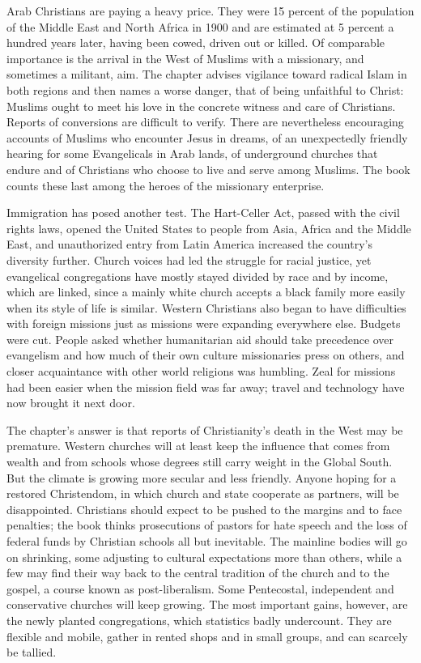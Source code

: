 Arab Christians are paying a heavy price. They were 15 percent of the population of the Middle East
and North Africa in 1900 and are estimated at 5 percent a hundred years later, having been cowed,
driven out or killed. Of comparable importance is the arrival in the West of Muslims with a
missionary, and sometimes a militant, aim. The chapter advises vigilance toward radical Islam in both
regions and then names a worse danger, that of being unfaithful to Christ: Muslims ought to meet his
love in the concrete witness and care of Christians. Reports of conversions are difficult to verify.
There are nevertheless encouraging accounts of Muslims who encounter Jesus in dreams, of an
unexpectedly friendly hearing for some Evangelicals in Arab lands, of underground churches that
endure and of Christians who choose to live and serve among Muslims. The book counts these last among
the heroes of the missionary enterprise.

Immigration has posed another test. The Hart-Celler Act, passed with the civil rights laws, opened
the United States to people from Asia, Africa and the Middle East, and unauthorized entry from Latin
America increased the country's diversity further. Church voices had led the struggle for racial
justice, yet evangelical congregations have mostly stayed divided by race and by income, which are
linked, since a mainly white church accepts a black family more easily when its style of life is
similar. Western Christians also began to have difficulties with foreign missions just as missions
were expanding everywhere else. Budgets were cut. People asked whether humanitarian aid should take
precedence over evangelism and how much of their own culture missionaries press on others, and closer
acquaintance with other world religions was humbling. Zeal for missions had been easier when the
mission field was far away; travel and technology have now brought it next door.

The chapter's answer is that reports of Christianity's death in the West may be premature. Western
churches will at least keep the influence that comes from wealth and from schools whose degrees still
carry weight in the Global South. But the climate is growing more secular and less friendly. Anyone
hoping for a restored Christendom, in which church and state cooperate as partners, will be
disappointed. Christians should expect to be pushed to the margins and to face penalties; the book
thinks prosecutions of pastors for hate speech and the loss of federal funds by Christian schools all
but inevitable. The mainline bodies will go on shrinking, some adjusting to cultural expectations
more than others, while a few may find their way back to the central tradition of the church and to
the gospel, a course known as post-liberalism. Some Pentecostal, independent and conservative
churches will keep growing. The most important gains, however, are the newly planted congregations,
which statistics badly undercount. They are flexible and mobile, gather in rented shops and in small
groups, and can scarcely be tallied.

